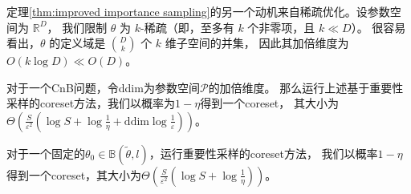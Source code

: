 定理\ref{thm:improved importance sampling}的另一个动机来自稀疏优化。设参数空间为 $\mathbb{R}^D$，
我们限制 $\theta$ 为 $k$-稀疏（即，至多有 $k$ 个非零项，且 $k \ll D$）。
很容易看出，$\theta$ 的定义域是 $\binom{D}{k}$ 个 $k$ 维子空间的并集，
因此其加倍维度为 $O(k \log D)\ll O(D)$。

\begin{theorem}
    对于一个CnB问题，令ddim为参数空间$\mathcal{P}$的加倍维度。
    那么运行上述基于重要性采样的coreset方法，我们以概率为$1-\eta$得到一个coreset，
    其大小为$\Theta\left(\frac{S}{\varepsilon^2}\left(\log S +\log \frac 1 \eta + \text{ddim}\log\frac{1}{\varepsilon}\right)\right)$。
    \label{thm:improved importance sampling}
\end{theorem}

\begin{corollary}
    对于一个固定的$\theta_0\in \mathbb{B}(\tilde{\theta},l)$，运行重要性采样的coreset方法，
    我们以概率$1-\eta$得到一个coreset，其大小为$\Theta\left(\frac{S}{\varepsilon^2}\left(\log S +\log \frac 1 \eta \right)\right)$。
    \label{cor:importance sampling with fixed theta}
\end{corollary}
